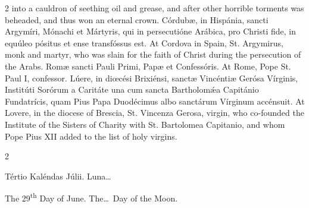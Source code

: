 \begin{paracol}{2}
 into a cauldron of seething oil and grease, and after other horrible 
 torments was beheaded, and thus won an eternal crown.
\switchcolumn*
{}
Córdubæ, in Hispánia, 
 sancti Argymíri, Mónachi et Mártyris, qui in persecutióne Arábica, pro 
 Christi fide, in equúleo pósitus et ense transfóssus est.
\switchcolumn
{}
At Cordova in Spain, St. Argymirus, 
 monk and martyr, who was slain for the faith of Christ during the 
 persecution of the Arabs.
\switchcolumn*
{}
Romæ sancti Pauli Primi, 
 Papæ et Confessóris.
\switchcolumn
{}
At Rome, Pope St. Paul I, confessor.
\switchcolumn*
{}
Lúere, in diœcési 
 Brixiénsi, sanctæ Vincéntiæ Gerósa Vírginis, Institúti Sorórum a Caritáte 
 una cum sancta Bartholomǽa Capitánio Fundatrícis, quam Pius Papa Duodécimus 
 albo sanctárum Vírginum accénsuit.
\switchcolumn
{}
At Lovere, in the diocese of 
 Brescia, St. Vincenza Gerosa, virgin, who co-founded the Institute of the 
 Sisters of Charity with St. Bartolomea Capitanio, and whom Pope Pius XII 
 added to the list of holy virgins.
\switchcolumn*
{}
\end{paracol}


\begin{paracol}{2}
\begin{center}{\color{gregoriocolor} Tértio Kaléndas Júlii. 
 Luna\dots\ }\end{center}
\switchcolumn
{}
\begin{center}{\color{gregoriocolor} The 
 29\textsuperscript{th} Day of 
 June. The\dots\ Day of the Moon.}\end{center}
\end{paracol}

